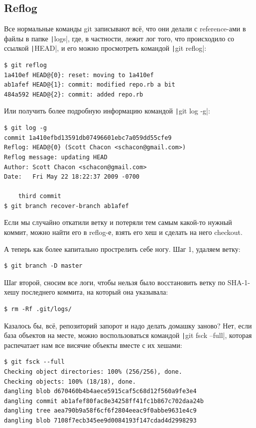\documentclass[a5paper]{article}
\begin{document}
\subsection{Reflog}

Все нормальные команды git записывают всё, что они делали с reference-ами в файлы в папке \texttt|logs|, где, в частности, лежит лог того, что происходило со ссылкой \texttt|HEAD|, и его можно просмотреть командой \texttt|git reflog|:

\begin{verbatim}
$ git reflog
1a410ef HEAD@{0}: reset: moving to 1a410ef
ab1afef HEAD@{1}: commit: modified repo.rb a bit
484a592 HEAD@{2}: commit: added repo.rb
\end{verbatim}

Или получить более подробную информацию командой \texttt|git log -g|:

\begin{verbatim}
$ git log -g
commit 1a410efbd13591db07496601ebc7a059dd55cfe9
Reflog: HEAD@{0} (Scott Chacon <schacon@gmail.com>)
Reflog message: updating HEAD
Author: Scott Chacon <schacon@gmail.com>
Date:   Fri May 22 18:22:37 2009 -0700

    third commit
$ git branch recover-branch ab1afef
\end{verbatim}

Если мы случайно откатили ветку и потеряли тем самым какой-то нужный коммит, можно найти его в reflog-е, взять его хеш и сделать на него checkout.

А теперь как более капитально прострелить себе ногу. Шаг 1, удаляем ветку:

\begin{verbatim}
$ git branch -D master
\end{verbatim}

Шаг второй, сносим все логи, чтобы нельзя было восстановить ветку по SHA-1-хешу последнего коммита, на который она указывала:

\begin{verbatim}
$ rm -Rf .git/logs/
\end{verbatim}

Казалось бы, всё, репозиторий запорот и надо делать домашку заново? Нет, если база объектов на месте, можно воспользоваться командой \texttt|git fsck --full|, которая распечатает нам все висячие объекты вместе с их хешами:

\begin{verbatim}
$ git fsck --full
Checking object directories: 100% (256/256), done.
Checking objects: 100% (18/18), done.
dangling blob d670460b4b4aece5915caf5c68d12f560a9fe3e4
dangling commit ab1afef80fac8e34258ff41fc1b867c702daa24b
dangling tree aea790b9a58f6cf6f2804eeac9f0abbe9631e4c9
dangling blob 7108f7ecb345ee9d0084193f147cdad4d2998293
\end{verbatim}
\end{document}
